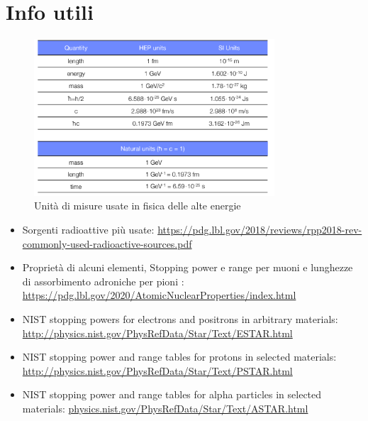 \chapter{Info utili}

\begin{figure}[H]
    \centering
    \includegraphics[width=0.8\textwidth]{./Chapters/images/Appendice/image-20220214164823650.png}
    \caption{Unità di misure usate in fisica delle alte energie}
    \label{fig:}
\end{figure}




\begin{itemize}
    \item Sorgenti radioattive più usate: \url{https://pdg.lbl.gov/2018/reviews/rpp2018-rev-commonly-used-radioactive-sources.pdf}
    \item Proprietà di alcuni elementi, Stopping power e range per muoni  e lunghezze di assorbimento adroniche per pioni : \url{https://pdg.lbl.gov/2020/AtomicNuclearProperties/index.html} 
    \item NIST stopping powers for electrons and positrons in arbitrary materials: \url{http://physics.nist.gov/PhysRefData/Star/Text/ESTAR.html}
    \item NIST stopping power and range tables for protons in selected materials: \url{http://physics.nist.gov/PhysRefData/Star/Text/PSTAR.html}
    \item NIST stopping power and range tables for alpha particles in selected materials: \url{physics.nist.gov/PhysRefData/Star/Text/ASTAR.html}
\end{itemize}




